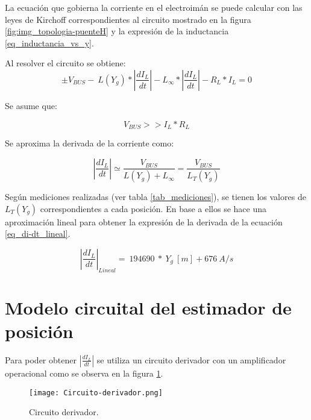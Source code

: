 \noindent La ecuaci\'{o}n que gobierna la corriente en el electroim\'{a}n se puede calcular con las leyes de Kirchoff correspondientes al circuito mostrado en la figura \ref{fig:img_topologia-puenteH} y la expresión de la inductancia \ref{eq_inductancia_vs_y}.


\noindent Al resolver el circuito se obtiene:
\begin{equation} \label{eq_VbusCondicion}
	\pm V_{BUS}-\ L(Y_g)*\left|\frac{{dI}_L}{dt}\right|-L_{\infty }*\left|\frac{{dI}_L}{dt}\right|-R_L*I_L=0
\end{equation}


\noindent Se asume que:

\begin{equation} \label{eq_Derivadadi-dt}
	V_{BUS}>>I_L*R_L
\end{equation}
 
\noindent Se aproxima la derivada de la corriente como:

\begin{equation} \label{eq_derivadaAproximacion}
	\left|\frac{{dI}_L}{dt}\right|\simeq \frac{V_{BUS}}{L(Y_g)+L_{\infty }}=\frac{V_{BUS}}{L_T(Y_g)}
\end{equation}

\noindent Según mediciones realizadas (ver tabla \ref{tab_mediciones}), se tienen los valores de $L_T(Y_g)$ correspondientes a cada posici\'{o}n. En base a ellos se hace una aproximaci\'{o}n lineal para obtener la expresi\'{o}n de la derivada de la ecuaci\'{o}n \ref{eq_di-dt_lineal}.

\noindent 

\begin{equation} \label{eq_di-dt_lineal}
{\left|\frac{{dI}_L}{dt}\right|}_{Lineal}=\ 194690\ *\ Y_g\:[m]+676\:A/s
\end{equation}

\section{Modelo circuital del estimador de posici\'{o}n}

\noindent Para poder obtener $\left|\frac{{dI}_L}{dt}\right|$ se utiliza un circuito derivador con un amplificador operacional como se observa en la figura  \ref{fig:img_Circuito-derivador}.

\begin{figure}[H]
	\centering
	\texttt{[image: Circuito-derivador.png]}
	\caption{Circuito derivador.}
	\label{fig:img_Circuito-derivador}
\end{figure}


